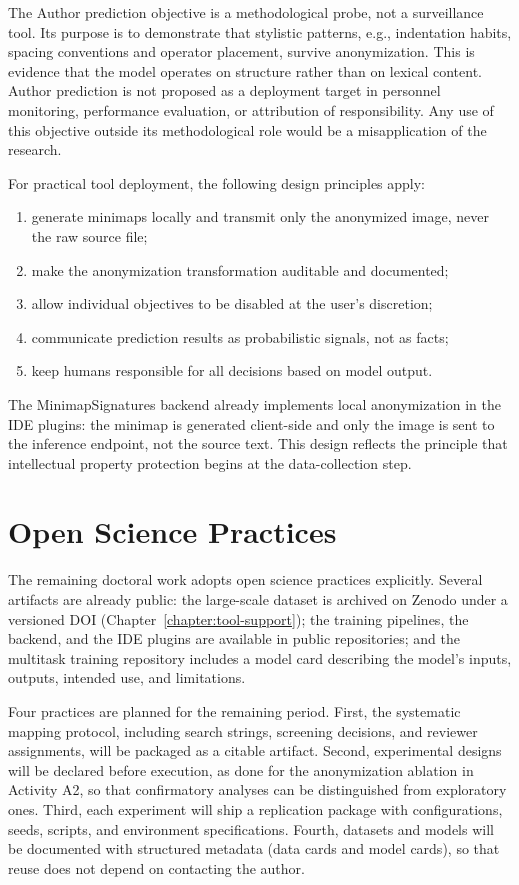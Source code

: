 The Author prediction objective is a methodological probe, not a surveillance
tool. Its purpose is to demonstrate that stylistic patterns, e.g., indentation
habits, spacing conventions and operator placement, survive anonymization. This
is evidence
that the model operates on structure rather than on lexical content. Author
prediction is not proposed as a deployment target in personnel monitoring,
performance evaluation, or attribution of responsibility. Any use of this
objective outside its methodological role would be a misapplication of the
research.

For practical tool deployment, the following design principles apply:

\begin{enumerate}
    \item generate minimaps locally and transmit only the anonymized image, never
    the raw source file;
    \item make the anonymization transformation auditable and documented;
    \item allow individual objectives to be disabled at the user's discretion;
    \item communicate prediction results as probabilistic signals, not as facts;
    \item keep humans responsible for all decisions based on model output.
\end{enumerate}

The MinimapSignatures backend already implements local anonymization in the IDE
plugins: the minimap is generated client-side and only the image is sent to the
inference endpoint, not the source text. This design reflects the principle that
intellectual property protection begins at the data-collection step.

\section{Open Science Practices}

The remaining doctoral work adopts open science practices explicitly. Several
artifacts are already public: the large-scale dataset is archived on Zenodo
under a versioned DOI (Chapter~\ref{chapter:tool-support}); the training
pipelines, the backend, and the IDE plugins are available in public
repositories; and the
multitask training repository includes a model card describing the model's
inputs, outputs, intended use, and limitations.

Four practices are planned for the remaining period. First, the systematic
mapping protocol, including search strings, screening decisions, and reviewer
assignments, will be packaged as a citable artifact. Second, experimental
designs will be declared before execution, as done for the anonymization
ablation in Activity A2, so that confirmatory analyses can be distinguished
from exploratory ones. Third, each experiment will ship a replication package
with configurations, seeds, scripts, and environment specifications. Fourth,
datasets and models will be documented with structured metadata (data cards
and model cards), so that reuse does not depend on contacting the author.

